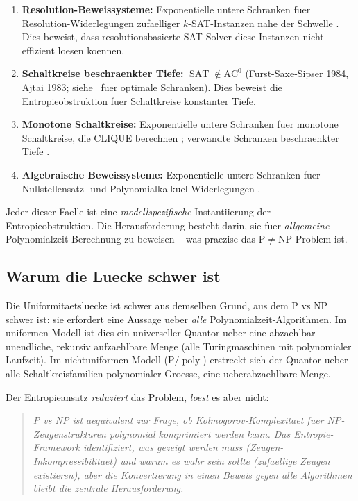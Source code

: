 \documentclass[aps,prd,twocolumn,superscriptaddress,nofootinbib]{revtex4-2}
\theoremstyle{definition}
\theoremstyle{remark}
\DeclareMathOperator{\poly}{poly}
\DeclareMathOperator{\SAT}{SAT}
\newcommand{\NP}{\mathrm{NP}}
\newcommand{\PP}{\mathrm{P}}
\begin{document}
\begin{enumerate}
\item \textbf{Resolution-Beweissysteme:} Exponentielle untere Schranken fuer Resolution-Widerlegungen zufaelliger $k$-SAT-Instanzen nahe der Schwelle \cite{BenSasson2001}. Dies beweist, dass resolutionsbasierte SAT-Solver diese Instanzen nicht effizient loesen koennen.

\item \textbf{Schaltkreise beschraenkter Tiefe:} $\SAT \notin \mathrm{AC}^0$ (Furst-Saxe-Sipser 1984, Ajtai 1983; siehe~\cite{Hastad1987} fuer optimale Schranken). Dies beweist die Entropieobstruktion fuer Schaltkreise konstanter Tiefe.

\item \textbf{Monotone Schaltkreise:} Exponentielle untere Schranken fuer monotone Schaltkreise, die CLIQUE berechnen \cite{Razborov1985}; verwandte Schranken beschraenkter Tiefe \cite{Razborov1987}.

\item \textbf{Algebraische Beweissysteme:} Exponentielle untere Schranken fuer Nullstellensatz- und Polynomialkalkuel-Widerlegungen \cite{Grigoriev2001}.
\end{enumerate}

Jeder dieser Faelle ist eine \textit{modellspezifische} Instantiierung der Entropieobstruktion. Die Herausforderung besteht darin, sie fuer \textit{allgemeine} Polynomialzeit-Berechnung zu beweisen -- was praezise das $\PP \neq \NP$-Problem ist.

\subsection{Warum die Luecke schwer ist}

Die Uniformitaetsluecke ist schwer aus demselben Grund, aus dem $\PP$ vs $\NP$ schwer ist: sie erfordert eine Aussage ueber \textit{alle} Polynomialzeit-Algorithmen. Im uniformen Modell ist dies ein universeller Quantor ueber eine abzaehlbar unendliche, rekursiv aufzaehlbare Menge (alle Turingmaschinen mit polynomialer Laufzeit). Im nichtuniformen Modell ($\PP/\poly$) erstreckt sich der Quantor ueber alle Schaltkreisfamilien polynomialer Groesse, eine ueberabzaehlbare Menge.

Der Entropieansatz \textit{reduziert} das Problem, \textit{loest} es aber nicht:
\begin{quote}
\textit{P vs NP ist aequivalent zur Frage, ob Kolmogorov-Komplexitaet fuer NP-Zeugenstrukturen polynomial komprimiert werden kann. Das Entropie-Framework identifiziert, was gezeigt werden muss (Zeugen-Inkompressibilitaet) und warum es wahr sein sollte (zufaellige Zeugen existieren), aber die Konvertierung in einen Beweis gegen alle Algorithmen bleibt die zentrale Herausforderung.}
\end{quote}
\end{document}
